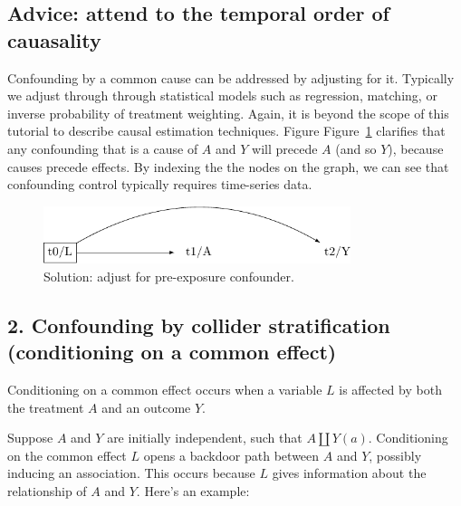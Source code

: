 \documentclass[
  singlecolumn]{report}
\begin{document}
\hypertarget{advice-attend-to-the-temporal-order-of-cauasality}{%
\subsection{Advice: attend to the temporal order of
cauasality}\label{advice-attend-to-the-temporal-order-of-cauasality}}

Confounding by a common cause can be addressed by adjusting for it.
Typically we adjust through through statistical models such as
regression, matching, or inverse probability of treatment weighting.
Again, it is beyond the scope of this tutorial to describe causal
estimation techniques. Figure Figure~\ref{fig-dag-common-cause-solution}
clarifies that any confounding that is a cause of \(A\) and \(Y\) will
precede \(A\) (and so \(Y\)), because causes precede effects. By
indexing the the nodes on the graph, we can see that confounding control
typically requires time-series data.

\begin{figure}

{\centering \includegraphics[width=0.8\textwidth,height=\textheight]{causal-dags_files/figure-pdf/fig-dag-common-cause-solution-1.pdf}

}

\caption{\label{fig-dag-common-cause-solution}Solution: adjust for
pre-exposure confounder.}

\end{figure}

\hypertarget{confounding-by-collider-stratification-conditioning-on-a-common-effect}{%
\subsection{2. Confounding by collider stratification (conditioning on a
common
effect)}\label{confounding-by-collider-stratification-conditioning-on-a-common-effect}}

Conditioning on a common effect occurs when a variable \(L\) is affected
by both the treatment \(A\) and an outcome \(Y\).

Suppose \(A\) and \(Y\) are initially independent, such that
\(A \coprod Y(a)\). Conditioning on the common effect \(L\) opens a
backdoor path between \(A\) and \(Y\), possibly inducing an association.
This occurs because \(L\) gives information about the relationship of
\(A\) and \(Y\). Here's an example:
\end{document}
